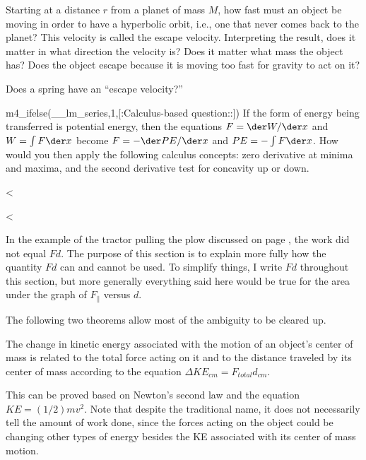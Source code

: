 \begin{dq}
Starting at a distance $r$ from a planet of mass $M$, how
fast must an object be moving in order to have a hyperbolic
orbit, i.e., one that never comes back to the planet? This
velocity is called the escape velocity. Interpreting the
result, does it matter in what direction the velocity is?
Does it matter what mass the object has? Does the object
escape because it is moving too fast for gravity to act on it?
\end{dq}

\begin{dq}
Does a spring have an ``escape velocity?''
\end{dq}

\begin{dq}
m4_ifelse(__lm_series,1,[:Calculus-based question::]) If the form of energy being
transferred is potential energy, then the equations 
$F=\der W/\der x$ and $W=\int F \der x$
become
$F=-\der PE/\der x$ and $PE=-\int F \der x$.
How would you then apply the following
calculus concepts: zero derivative at minima and maxima, and
the second derivative test for concavity up or down.
\end{dq}

<%

<%

In the example of the tractor pulling the plow discussed on page
\pageref{plow-discussion},
the work did not equal $Fd$.
The purpose of this section is to explain more fully how the
quantity $Fd$ can and cannot be used. To simplify
things, I write $Fd$ throughout this section, but more
generally everything said here would be true for the area
under the graph of $F_{\parallel}$ versus $d$.

The following two theorems
allow most of the ambiguity to be cleared up.

\begin{lessimportant}
The change in kinetic energy associated with the motion of
an object's center of mass is related to the total force acting
on it and to the distance traveled by its center of mass
according to the equation $\Delta KE_{cm}=F_{total}d_{cm}$.
\end{lessimportant}

This can be proved based on Newton's second law and the
equation $KE=(1/2)mv^2$. Note that despite the traditional
name, it does not necessarily tell the amount of work done,
since the forces acting on the object could be changing
other types of energy besides the KE associated with
its center of mass motion.

